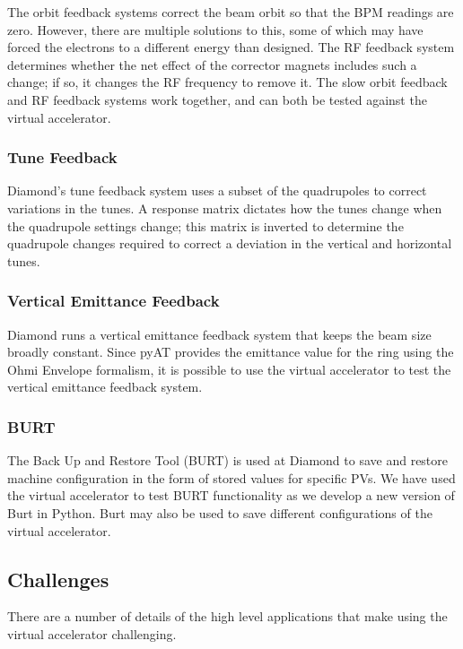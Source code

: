 \documentclass[a4paper,
               keeplastbox,   %
               ]{jacow}
\begin{document}
The orbit feedback systems correct the beam orbit so that the BPM readings are zero.
However, there are multiple solutions to this, some of which may have forced the
electrons to a different energy than designed. The RF feedback system determines
whether the net effect of the corrector magnets includes such a change; if so, it
changes the RF frequency to remove it. The slow orbit feedback and RF feedback 
systems work together, and can both be tested against the virtual accelerator.

\subsubsection{Tune Feedback}

Diamond's tune feedback system \cite{feedbacks} uses a subset of the quadrupoles 
to correct variations in the tunes. A response matrix dictates how the tunes 
change when the quadrupole settings change; this matrix is inverted to determine 
the quadrupole changes required to correct a deviation in the vertical and 
horizontal tunes.

\subsubsection{Vertical Emittance Feedback}

Diamond runs a vertical emittance feedback system \cite{feedbacks} that keeps the beam 
size broadly constant. Since pyAT provides the emittance value for the ring using the 
Ohmi Envelope formalism, it is possible to use the virtual accelerator to test the 
vertical emittance feedback system.

\subsubsection{BURT}

The Back Up and Restore Tool (BURT) is used at Diamond to save and restore machine
configuration in the form of stored values for specific PVs. We have used the virtual
accelerator to test BURT functionality as we develop a new version of Burt in Python.
Burt may also be used to save different configurations of the virtual accelerator.

\subsection{Challenges}

There are a number of details of the high level applications that make using the
virtual accelerator challenging.
\end{document}
